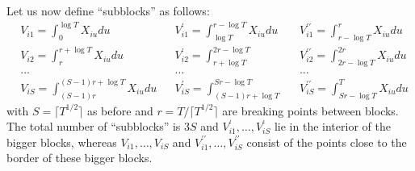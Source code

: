 \documentclass[a4paper,12pt]{article}
\begin{document}
Let us now define ``subblocks'' as follows:
\begin{align*}
&V_{i1} = \int_{0}^{\log T} X_{iu}du  && V_{i1}^\prime = \int_{\log T}^{r - \log T} X_{iu}du &&V_{i1}^{\prime\prime} = \int_{r - \log T}^{r} X_{iu}du \\
&V_{i2} = \int_{r}^{r + \log T} X_{iu}du &&V_{i2}^\prime = \int_{r + \log T}^{2r - \log T}&& V_{i2}^{\prime\prime} = \int_{2r - \log T}^{2 r} X_{iu}du \\
&\ldots && \ldots && \ldots\\
&V_{iS} = \int_{(S-1) r}^{(S-1)r + \log T} X_{iu}du && V_{iS}^\prime = \int_{(S-1)r + \log T}^{Sr - \log T} && V_{iS}^{\prime\prime} = \int_{Sr - \log T}^{T} X_{iu}du
\end{align*}
with $S =\lceil T^{1/2} \rceil$ as before and $r = T / \lceil T^{1/2} \rceil$ are breaking points between blocks. The total number of ``subblocks'' is $3S$ and $V_{i1}^\prime, \ldots, V_{iS}^\prime$ lie in the interior of the bigger blocks, whereas  $V_{i1}, \ldots, V_{iS}$ and $V_{i1}^{\prime\prime}, \ldots, V_{iS}^{\prime\prime}$ consist of the points close to the border of these bigger blocks.
\end{document}
